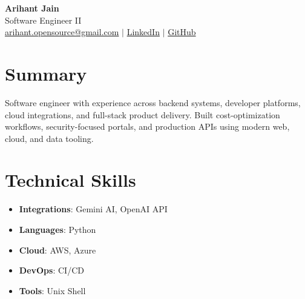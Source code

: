 \documentclass[11pt,a4paper]{article}
\begin{document}
\begin{center}
{\LARGE \textbf{Arihant Jain}}
\\ Software Engineer II
\\ \href{mailto:arihant.opensource@gmail.com}{arihant.opensource@gmail.com} $\mid$ \href{https://linkedin.com/in/arihantjain1208}{LinkedIn} $\mid$ \href{https://github.com/Arihant1208}{GitHub}
\end{center}

\section{Summary}
Software engineer with experience across backend systems, developer platforms, cloud integrations, and full-stack product delivery. Built cost-optimization workflows, security-focused portals, and production APIs using modern web, cloud, and data tooling.

\section{Technical Skills}
\begin{itemize}
  \item \textbf{Integrations}: Gemini AI, OpenAI API
  \item \textbf{Languages}: Python
  \item \textbf{Cloud}: AWS, Azure
  \item \textbf{DevOps}: CI/CD
  \item \textbf{Tools}: Unix Shell
\end{itemize}
\end{document}
